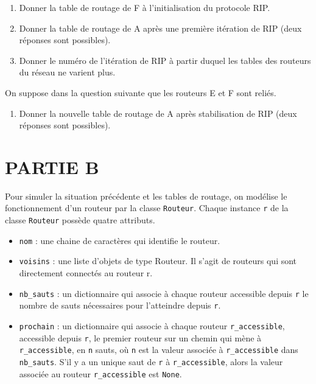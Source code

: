 \begin{enumerate}[series=monDS, resume]
    \item Donner la table de routage de F à l’initialisation du protocole RIP.

    \medskip

    \item Donner la table de routage de A après une première itération de RIP (deux réponses sont possibles).
    
    \medskip
    \item Donner le numéro de l’itération de RIP à partir duquel les tables des routeurs du réseau ne varient plus. \hfill 
\end{enumerate}

\medskip

On suppose dans la question suivante que les routeurs E et F sont reliés.

\begin{enumerate}[series=monDS, resume]
    \item Donner la nouvelle table de routage de A après stabilisation de RIP (deux réponses sont possibles).

\end{enumerate}

\medskip

\section*{PARTIE B}

\medskip

Pour simuler la situation précédente et les tables de routage, on modélise le fonctionnement d’un routeur par la classe \verb|Routeur|. Chaque instance \verb|r| de la classe \verb|Routeur| possède quatre attributs.

\begin{itemize}
    \item \verb|nom| : une chaine de caractères qui identifie le routeur.
    \item \verb|voisins| : une liste d’objets de type Routeur. Il s’agit de routeurs qui sont directement connectés au routeur r.
    \item \verb|nb_sauts| : un dictionnaire qui associe à chaque routeur accessible depuis \verb|r| le nombre de sauts nécessaires pour l’atteindre depuis \verb|r|.
    \item \verb|prochain| : un dictionnaire qui associe à chaque routeur \verb|r_accessible|, accessible depuis \verb|r|, le premier routeur sur un chemin qui mène à \verb|r_accessible|, en \verb|n| sauts, où \verb|n| est la valeur associée à \verb|r_accessible| dans \verb|nb_sauts|. S’il y a un unique saut de \verb|r| à \verb|r_accessible|, alors la valeur associée au routeur \verb|r_accessible| est \verb|None|.
\end{itemize}

